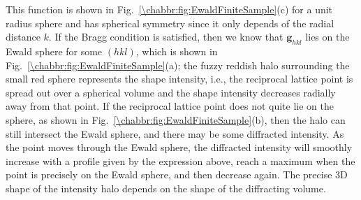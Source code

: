 This function is shown in Fig.~\ref{\chabbr:fig:EwaldFiniteSample}(c) for a unit radius sphere and has spherical symmetry since it only depends of the radial distance  $k$. If the Bragg condition is satisfied, then we know that $\mathbf{g}_{hkl}$ lies on the Ewald sphere for some $(hkl)$, which is shown in Fig.~\ref{\chabbr:fig:EwaldFiniteSample}(a); the fuzzy reddish halo surrounding the small red sphere represents the shape intensity, i.e., the reciprocal lattice point is spread out over a spherical volume and the shape intensity decreases radially away from that point.  If the reciprocal lattice point does not quite lie on the sphere, as shown in Fig.~\ref{\chabbr:fig:EwaldFiniteSample}(b), then the halo can still intersect the Ewald sphere, and there may be some diffracted intensity. As the point moves through the Ewald sphere, the diffracted intensity will smoothly increase with a profile given by the expression above, reach a maximum when the point is precisely on the Ewald sphere, and then decrease again.  The precise 3D shape of the intensity halo depends on the shape of the diffracting volume.

